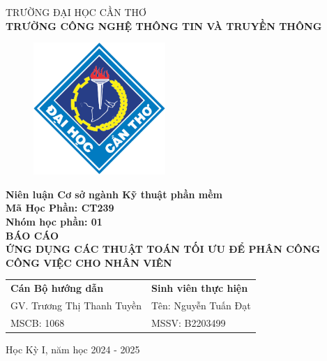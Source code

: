 \begin{titlepage}
  \begin{center}
    \vspace{-6pt}TRƯỜNG ĐẠI HỌC CẦN THƠ \\
    \textbf{\fontsize{16pt}{0pt}\selectfont TRƯỜNG CÔNG NGHỆ THÔNG TIN VÀ TRUYỀN THÔNG}
    \begin{figure}[H]
      \centering
      \includegraphics[width=5cm]{images/logo-ctu.png}
    \end{figure}
    \textbf{Niên luận Cơ sở ngành Kỹ thuật phần mềm} \\
    \textbf{Mã Học Phần: CT239} \\
    \textbf{Nhóm học phần: 01} \\
    \vspace{3.5cm}
    \textbf{\fontsize{16pt}{0pt}\selectfont BÁO CÁO} \\
    \textbf{\fontsize{18pt}{0pt}\selectfont ỨNG DỤNG CÁC THUẬT TOÁN TỐI ƯU ĐỂ PHÂN CÔNG CÔNG VIỆC CHO NHÂN VIÊN} \\
    \vspace{4.5cm}
    \newcommand{\MyIndent}{\hspace{1cm}}
    \begin{tabular}{p{8cm} l}
      \textbf{Cán Bộ hướng dẫn}         & \textbf{Sinh viên thực hiện}  \\
      \MyIndent GV. Trương Thị Thanh Tuyền & \MyIndent Tên: Nguyễn Tuấn Đạt \\
      \MyIndent MSCB: 1068                 & \MyIndent MSSV: B2203499
    \end{tabular}


    \vspace{1.5cm}
    \fontsize{14pt}{0pt}\selectfont Học Kỳ I, năm học 2024 - 2025
  \end{center}
\end{titlepage}
\cleardoublepage